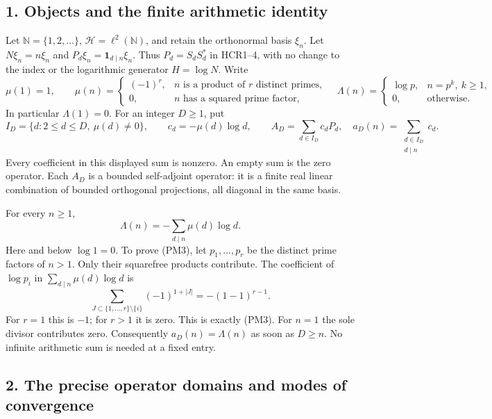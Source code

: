 \documentclass[
  10pt,
  a4paper,
]{article}
\begin{document}
\subsection{1. Objects and the finite arithmetic
identity}\label{objects-and-the-finite-arithmetic-identity}

Let \(\mathbb N=\{1,2,\ldots\}\), \(\mathcal H=\ell^2(\mathbb N)\), and
retain the orthonormal basis \(\xi_n\). Let \(N\xi_n=n\xi_n\) and
\(P_d\xi_n=\mathbf1_{d\mid n}\xi_n\). Thus \(P_d=S_dS_d^*\) in HCR1--4,
with no change to the index or the logarithmic generator \(H=\log N\).
Write \[
\mu(1)=1,\qquad
\mu(n)=\begin{cases}(-1)^r,&n\text{ is a product of }r\text{ distinct primes},\\0,&n\text{ has a squared prime factor},\end{cases}
\quad
\Lambda(n)=\begin{cases}\log p,&n=p^k,\ k\ge1,\\0,&\text{otherwise}.
\end{cases}
\tag{PM1}
\] In particular \(\Lambda(1)=0\). For an integer \(D\ge1\), put \[
I_D=\{d:2\le d\le D,\ \mu(d)\ne0\},\qquad
c_d=-\mu(d)\log d,\qquad
A_D=\sum_{d\in I_D}c_dP_d,
\quad a_D(n)=\sum_{\substack{d\in I_D\\d\mid n}}c_d.
\tag{PM2}
\] Every coefficient in this displayed sum is nonzero. An empty sum is
the zero operator. Each \(A_D\) is a bounded self-adjoint operator: it
is a finite real linear combination of bounded orthogonal projections,
all diagonal in the same basis.

For every \(n\ge1\), \[
\boxed{\Lambda(n)=-\sum_{d\mid n}\mu(d)\log d.}
\tag{PM3}
\] Here and below \(\log1=0\). To prove (PM3), let \(p_1,\ldots,p_r\) be
the distinct prime factors of \(n>1\). Only their squarefree products
contribute. The coefficient of \(\log p_i\) in
\(\sum_{d\mid n}\mu(d)\log d\) is \[
\sum_{J\subset\{1,\ldots,r\}\setminus\{i\}}(-1)^{1+|J|}
=-(1-1)^{r-1}.
\] For \(r=1\) this is \(-1\); for \(r>1\) it is zero. This is exactly
(PM3). For \(n=1\) the sole divisor contributes zero. Consequently
\(a_D(n)=\Lambda(n)\) as soon as \(D\ge n\). No infinite arithmetic sum
is needed at a fixed entry.

\subsection{2. The precise operator domains and modes of
convergence}\label{the-precise-operator-domains-and-modes-of-convergence}
\end{document}

